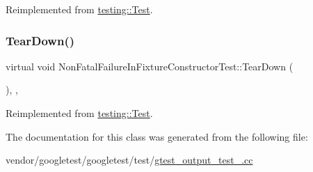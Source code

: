Reimplemented from \hyperlink{classtesting_1_1_test_a190315150c303ddf801313fd1a777733}{testing\+::\+Test}.

\mbox{\label{class_non_fatal_failure_in_fixture_constructor_test_ab76d79c346d9a378d625fde5739e8ad6}} 
\subsubsection{\texorpdfstring{Tear\+Down()}{TearDown()}}
{\footnotesize\ttfamily virtual void Non\+Fatal\+Failure\+In\+Fixture\+Constructor\+Test\+::\+Tear\+Down (\begin{DoxyParamCaption}{ }\end{DoxyParamCaption})\hspace{0.3cm}{\ttfamily [inline]}, {\ttfamily [protected]}, {\ttfamily [virtual]}}



Reimplemented from \hyperlink{classtesting_1_1_test_a5f0ab439802cbe0ef7552f1a9f791923}{testing\+::\+Test}.



The documentation for this class was generated from the following file\+:\begin{DoxyCompactItemize}
\item 
vendor/googletest/googletest/test/\hyperlink{gtest__output__test___8cc}{gtest\+\_\+output\+\_\+test\+\_\+.\+cc}\end{DoxyCompactItemize}
